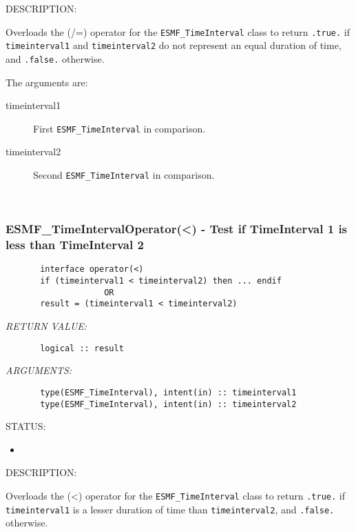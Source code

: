 {\sf DESCRIPTION:\\ }


       Overloads the (/=) operator for the {\tt ESMF\_TimeInterval} class to
       return {\tt .true.} if {\tt timeinterval1} and {\tt timeinterval2} do not 
       represent an equal duration of time, and {\tt .false.} otherwise.
  
       The arguments are:
       \begin{description}
       \item[timeinterval1]
            First {\tt ESMF\_TimeInterval} in comparison.
       \item[timeinterval2]
            Second {\tt ESMF\_TimeInterval} in comparison.
       \end{description}
    
 
\mbox{}\hrulefill\ 
 
\subsubsection [ESMF\_TimeIntervalOperator(<)] {ESMF\_TimeIntervalOperator(<) - Test if TimeInterval 1 is less than TimeInterval 2}


  
\begin{verbatim}       interface operator(<)
       if (timeinterval1 < timeinterval2) then ... endif
                    OR
       result = (timeinterval1 < timeinterval2)\end{verbatim}{\em RETURN VALUE:}
\begin{verbatim}       logical :: result\end{verbatim}{\em ARGUMENTS:}
\begin{verbatim}       type(ESMF_TimeInterval), intent(in) :: timeinterval1
       type(ESMF_TimeInterval), intent(in) :: timeinterval2\end{verbatim}
{\sf STATUS:}
   \begin{itemize}
   \item{}
   \end{itemize}
  
{\sf DESCRIPTION:\\ }


       Overloads the (<) operator for the {\tt ESMF\_TimeInterval} class to
       return {\tt .true.} if {\tt timeinterval1} is a lesser duration of time 
       than {\tt timeinterval2}, and {\tt .false.} otherwise.
 
